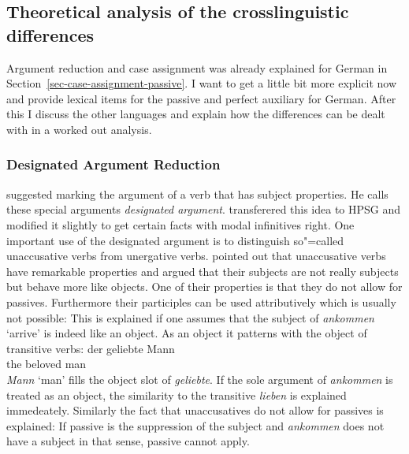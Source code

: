 \subsection{Theoretical analysis of the crosslinguistic differences}

Argument reduction and case assignment was already explained for German in
Section~\ref{sec-case-assignment-passive}. I want to get a little bit more explicit now and provide
lexical items for the passive and perfect auxiliary for German. After this I discuss the other
languages and explain how the differences can be dealt with in a worked out analysis.

\subsubsection{Designated Argument Reduction}

\citet{Haider86} suggested marking the argument of a verb that has subject properties. He calls
these special arguments \emph{designated argument}. \citet{HM94a} transferered this idea to HPSG and
\citet{Mueller2003e} modified it slightly to get certain facts with modal infinitives
right. One important use of the designated argument is to distinguish so"=called
unaccusative verbs from unergative verbs. \citet{Perlmutter78} pointed out that unaccusative verbs
have remarkable properties and argued that their subjects are not really subjects but behave more
like objects. One of their properties is that they do not allow for passives. Furthermore their
participles can be used attributively which is usually not possible:
\eal
{}
\zl
This is explained if one assumes that the subject of \emph{ankommen} `arrive' is indeed like an
object. As an object it patterns with the object of transitive verbs:
\ea
\gll der geliebte Mann\\
     the beloved  man\\
\z
\emph{Mann} `man' fills the object slot of \emph{geliebte}. If the sole argument of \emph{ankommen}
is treated as an object, the similarity to the transitive \emph{lieben} is explained
immedeately. Similarly the fact that unaccusatives do not allow for passives is explained: If
passive is the suppression of the subject and \emph{ankommen} does not have a subject in that sense,
passive cannot apply.
\eal
{}
\zl

